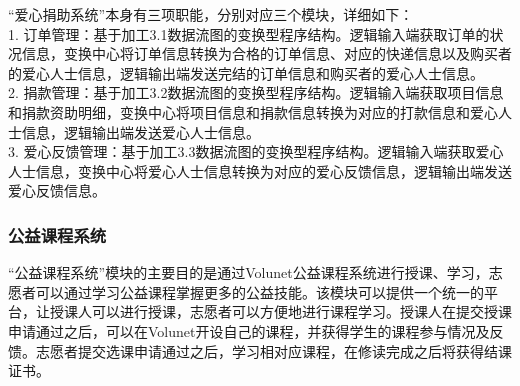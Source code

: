 “爱心捐助系统”本身有三项职能，分别对应三个模块，详细如下：\\
1. 订单管理：基于加工3.1数据流图的变换型程序结构。逻辑输入端获取订单的状况信息，变换中心将订单信息转换为合格的订单信息、对应的快递信息以及购买者的爱心人士信息，逻辑输出端发送完结的订单信息和购买者的爱心人士信息。\\
2. 捐款管理：基于加工3.2数据流图的变换型程序结构。逻辑输入端获取项目信息和捐款资助明细，变换中心将项目信息和捐款信息转换为对应的打款信息和爱心人士信息，逻辑输出端发送爱心人士信息。\\
3. 爱心反馈管理：基于加工3.3数据流图的变换型程序结构。逻辑输入端获取爱心人士信息，变换中心将爱心人士信息转换为对应的爱心反馈信息，逻辑输出端发送爱心反馈信息。\\

\begin{landscape}
\begin{figure}[bp]
    \end{figure}
\end{landscape}

\subsubsection{公益课程系统}

“公益课程系统”模块的主要目的是通过Volunet公益课程系统进行授课、学习，志愿者可以通过学习公益课程掌握更多的公益技能。该模块可以提供一个统一的平台，让授课人可以进行授课，志愿者可以方便地进行课程学习。授课人在提交授课申请通过之后，可以在Volunet开设自己的课程，并获得学生的课程参与情况及反馈。志愿者提交选课申请通过之后，学习相对应课程，在修读完成之后将获得结课证书。

